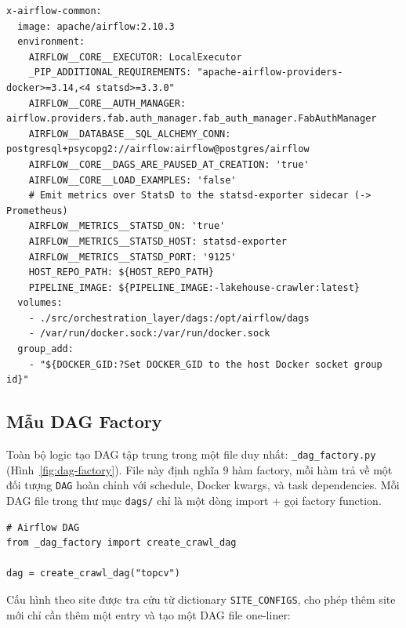 \begin{lstlisting}[style=bashstyle, caption={Cấu hình biến môi trường (docker-compose.yaml)}]
x-airflow-common:
  image: apache/airflow:2.10.3
  environment:
    AIRFLOW__CORE__EXECUTOR: LocalExecutor
    _PIP_ADDITIONAL_REQUIREMENTS: "apache-airflow-providers-docker>=3.14,<4 statsd>=3.3.0"
    AIRFLOW__CORE__AUTH_MANAGER: airflow.providers.fab.auth_manager.fab_auth_manager.FabAuthManager
    AIRFLOW__DATABASE__SQL_ALCHEMY_CONN: postgresql+psycopg2://airflow:airflow@postgres/airflow
    AIRFLOW__CORE__DAGS_ARE_PAUSED_AT_CREATION: 'true'
    AIRFLOW__CORE__LOAD_EXAMPLES: 'false'
    # Emit metrics over StatsD to the statsd-exporter sidecar (-> Prometheus)
    AIRFLOW__METRICS__STATSD_ON: 'true'
    AIRFLOW__METRICS__STATSD_HOST: statsd-exporter
    AIRFLOW__METRICS__STATSD_PORT: '9125'
    HOST_REPO_PATH: ${HOST_REPO_PATH}
    PIPELINE_IMAGE: ${PIPELINE_IMAGE:-lakehouse-crawler:latest}
  volumes:
    - ./src/orchestration_layer/dags:/opt/airflow/dags
    - /var/run/docker.sock:/var/run/docker.sock
  group_add:
    - "${DOCKER_GID:?Set DOCKER_GID to the host Docker socket group id}"
\end{lstlisting}


\subsection{Mẫu DAG Factory}
\label{subsec:dag-factory}

Toàn bộ logic tạo DAG tập trung trong một file duy nhất:
\texttt{\_dag\_factory.py}
(Hình~\ref{fig:dag-factory}). File này định nghĩa 9 hàm factory, mỗi hàm trả về
một đối tượng \texttt{DAG} hoàn chỉnh với schedule, Docker kwargs, và task
dependencies. Mỗi DAG file trong thư mục \texttt{dags/} chỉ là một dòng import
+ gọi factory function.

\begin{lstlisting}[style=pystyle, caption={Mẫu one-liner DAG file (crawl\_topcv.py)}]
# Airflow DAG
from _dag_factory import create_crawl_dag

dag = create_crawl_dag("topcv")
\end{lstlisting}

Cấu hình theo site được tra cứu từ dictionary \texttt{SITE\_CONFIGS}, cho phép thêm
site mới chỉ cần thêm một entry và tạo một DAG file one-liner:

